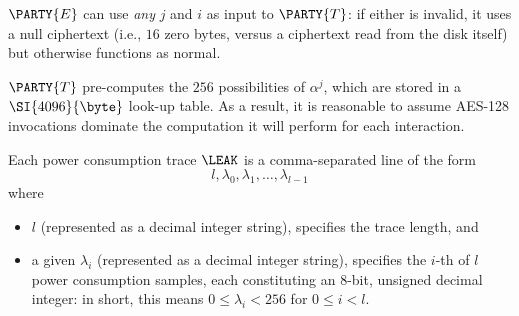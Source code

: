 \begin{itemize}
{      $\PARTY{E}$ can use {\em any} $j$ and $i$ as input to $\PARTY{T}$: if 
      either is invalid, it uses a null ciphertext 
      (i.e., $16$ zero bytes, versus a ciphertext read from the disk itself) 
      but otherwise functions as normal.
\item $\PARTY{T}$ pre-computes the $256$ possibilities of $\alpha^j$, which 
      are stored in a $\SI{4096}{\byte}$ look-up table.  As a result, it is 
      reasonable to assume AES-128 invocations dominate the computation it 
      will perform for each interaction.
}{}%
\item Each power consumption trace $\LEAK$ is a comma-separated line of the 
      form
      \[
      l, \lambda_0, \lambda_1, \ldots, \lambda_{l-1}
      \]
      where
         
      \begin{itemize}
      \item $l$
            (represented as a                       decimal integer string),
            specifies the trace length, 
            and
      \item a given $\lambda_i$ 
            (represented as a                       decimal integer string),
            specifies the $i$-th of $l$ power consumption samples, each 
            constituting an $8$-bit, unsigned decimal integer: in short, 
            this means $0 \leq \lambda_i < 256$ for $0 \leq i < l$.
      \end{itemize}

\end{itemize}



